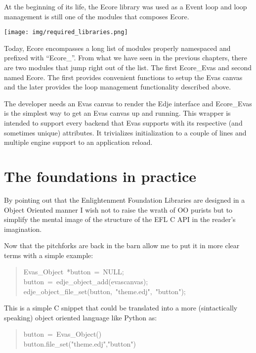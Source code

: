 \documentclass[12pt,a4paper,english]{book}
\begin{document}
At the beginning of its life, the Ecore library was used as a Event loop and
loop management is still one of the modules that composes Ecore.

{\hfill\texttt{[image: img/required\_libraries.png]}\hfill}

Today, Ecore encompasses a long list of modules properly namespaced and
prefixed with ``Ecore{\_}''. From what we have seen in the previous chapters, there
are two modules that jump right out of the list. The first Ecore{\_}Evas and
second named Ecore. The first provides convenient functions to setup the Evas
canvas and the later provides the loop management functionality described
above.

The developer needs an Evas canvas to render the Edje interface and Ecore{\_}Evas
is the simplest way to get an Evas canvas up and running. This wrapper is
intended to support every backend that Evas supports with its respective (and
sometimes unique) attributes. It trivializes initialization to a couple of
lines and multiple engine support to an application reload.



\hypertarget{the-foundations-in-practice}{}
\chapter{The foundations in practice}
\label{the-foundations-in-practice}

By pointing out that the Enlightenment Foundation Libraries are designed in a
Object Oriented manner I wish not to raise the wrath of OO purists but to
simplify the mental image of the structure of the EFL C API in the reader's
imagination.

Now that the pitchforks are back in the barn allow me to put it in more clear
terms with a simple example:
\begin{quote}{\ttfamily \raggedright \noindent
Evas{\_}Object~*button~=~NULL;~\\
button~=~edje{\_}object{\_}add(evascanvas);~\\
edje{\_}object{\_}file{\_}set(button,~"theme.edj",~"button");
}\end{quote}

This is a simple C snippet that could be translated into a more (sintactically
speaking) object oriented language like Python as:
\begin{quote}{\ttfamily \raggedright \noindent
button~=~Evas{\_}Object()~\\
button.file{\_}set("theme.edj","button")
}\end{quote}
\end{document}
